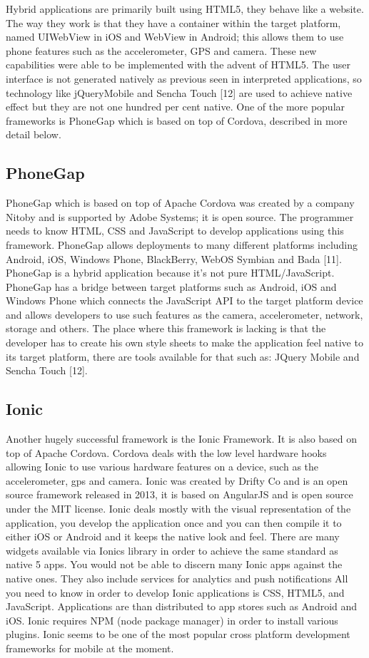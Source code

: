 Hybrid applications are primarily built using HTML5, they behave like a
website. The way they work is that they have a container within the target
platform, named UIWebView in iOS and WebView in Android; this allows
them to use phone features such as the accelerometer, GPS and camera.
These new capabilities were able to be implemented with the advent of
HTML5. The user interface is not generated natively as previous seen in
interpreted applications, so technology like jQueryMobile and Sencha Touch
[12] are used to achieve native effect but they are not one hundred per cent
native. One of the more popular frameworks is PhoneGap which is based on
top of Cordova, described in more detail below.

\subsection{PhoneGap}

PhoneGap which is based on top of Apache Cordova was created by a
company Nitoby and is supported by Adobe Systems; it is open source. The
programmer needs to know HTML, CSS and JavaScript to develop
applications using this framework. PhoneGap allows deployments to many
different platforms including Android, iOS, Windows Phone, BlackBerry,
WebOS Symbian and Bada [11]. PhoneGap is a hybrid application because it’s
not pure HTML/JavaScript. PhoneGap has a bridge between target platforms
such as Android, iOS and Windows Phone which connects the JavaScript API
to the target platform device and allows developers to use such features as
the camera, accelerometer, network, storage and others. The place where
this framework is lacking is that the developer has to create his own style
sheets to make the application feel native to its target platform, there are
tools available for that such as: JQuery Mobile and Sencha Touch [12].

\subsection{Ionic}

Another hugely successful framework is the Ionic Framework. It is also
based on top of Apache Cordova. Cordova deals with the low level hardware
hooks allowing Ionic to use various hardware features on a device, such as
the accelerometer, gps and camera.
Ionic was created by Drifty Co and is an open source framework released
in 2013, it is based on AngularJS and is open source under the MIT license.
Ionic deals mostly with the visual representation of the application, you
develop the application once and you can then compile it to either iOS or
Android and it keeps the native look and feel. There are many widgets
available via Ionics library in order to achieve the same standard as native
5
apps. You would not be able to discern many Ionic apps against the native
ones. They also include services for analytics and push notifications
All you need to know in order to develop Ionic applications is CSS, HTML5,
and JavaScript. Applications are than distributed to app stores such as
Android and iOS. Ionic requires NPM (node package manager) in order to
install various plugins. Ionic seems to be one of the most popular cross
platform development frameworks for mobile at the moment.

